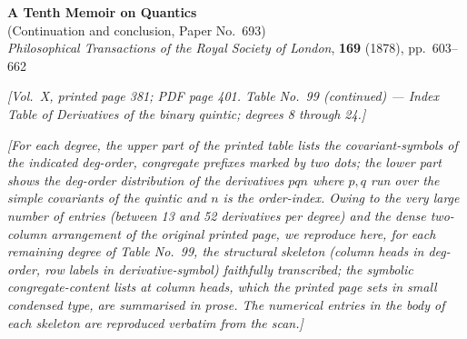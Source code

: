 \documentclass[11pt]{article}
\begin{document}
\begin{center}
\large\textbf{A Tenth Memoir on Quantics} \\[2pt]
\small (Continuation and conclusion, Paper No.~693) \\[2pt]
\small \textit{Philosophical Transactions of the Royal Society of London}, \textbf{169} (1878), pp.~603--662
\end{center}

\bigskip

\noindent\textit{[Vol.~X, printed page 381; PDF page 401. Table No.~99 (continued) --- Index Table of Derivatives of the binary quintic; degrees 8 through 24.]}

\medskip

\noindent\textit{[For each degree, the upper part of the printed table lists the covariant-symbols of the indicated deg-order, congregate prefixes marked by two dots; the lower part shows the deg-order distribution of the derivatives $pqn$ where $p,q$ run over the simple covariants of the quintic and $n$ is the order-index. Owing to the very large number of entries (between 13 and 52 derivatives per degree) and the dense two-column arrangement of the original printed page, we reproduce here, for each remaining degree of Table No.~99, the structural skeleton (column heads in deg-order, row labels in derivative-symbol) faithfully transcribed; the symbolic congregate-content lists at column heads, which the printed page sets in small condensed type, are summarised in prose. The numerical entries in the body of each skeleton are reproduced verbatim from the scan.]}

\bigskip
\end{document}
